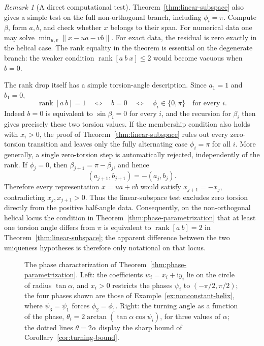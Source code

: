 \documentclass[10pt,a4paper]{amsart}
\theoremstyle{definition}
\theoremstyle{remark}
\newtheorem{remark}[theorem]{Remark}
\numberwithin{equation}{section}
\begin{document}
\begin{remark}[A direct computational test]\label{rem:linear-test}
Theorem~\ref{thm:linear-subspace} also gives a simple test on the full non-orthogonal branch, including $\phi_i=\pi$. Compute $\beta$, form $a,b$, and check whether $x$ belongs to their span. For numerical data one may solve $\min_{u,v}\|x-ua-vb\|$. For exact data, the residual is zero exactly in the helical case. The rank equality in the theorem is essential on the degenerate branch: the weaker condition $\operatorname{rank}[a\ b\ x]\le2$ would become vacuous when $b=0$.

The rank drop itself has a simple torsion-angle description. Since $a_1=1$ and $b_1=0$,
\[
\operatorname{rank}[a\ b]=1
\quad\Longleftrightarrow\quad
b=0
\quad\Longleftrightarrow\quad
\phi_i\in\{0,\pi\}\quad\text{for every }i.
\]
Indeed $b=0$ is equivalent to $\sin\beta_i=0$ for every $i$, and the recursion for $\beta_i$ then gives precisely these two torsion values. If the membership condition also holds with $x_i>0$, the proof of Theorem~\ref{thm:linear-subspace} rules out every zero-torsion transition and leaves only the fully alternating case $\phi_i=\pi$ for all $i$. More generally, a single zero-torsion step is automatically rejected, independently of the rank. If $\phi_j=0$, then $\beta_{j+1}=\pi-\beta_j$, and hence
\[
(a_{j+1},b_{j+1})=-(a_j,b_j).
\]
Therefore every representation $x=ua+vb$ would satisfy $x_{j+1}=-x_j$, contradicting $x_j,x_{j+1}>0$. Thus the linear-subspace test excludes zero torsion directly from the positive half-angle data. Consequently, on the non-orthogonal helical locus the condition in Theorem~\ref{thm:phase-parametrization} that at least one torsion angle differs from $\pi$ is equivalent to $\operatorname{rank}[a\ b]=2$ in Theorem~\ref{thm:linear-subspace}; the apparent difference between the two uniqueness hypotheses is therefore only notational on that locus.
\end{remark}

\begin{figure}[!ht]
\centering
\resizebox{0.97\textwidth}{!}{}
\caption{The phase characterization of Theorem~\ref{thm:phase-parametrization}. Left: the coefficients $w_i=x_i+\mathrm{i}y_i$ lie on the circle of radius $\tan\alpha$, and $x_i>0$ restricts the phases $\psi_i$ to $(-\pi/2,\pi/2)$; the four phases shown are those of Example~\ref{ex:nonconstant-helix}, where $\psi_3=\psi_1$ forces $\phi_2=\phi_1$. Right: the turning angle as a function of the phase, $\theta_i=2\arctan(\tan\alpha\cos\psi_i)$, for three values of $\alpha$; the dotted lines $\theta=2\alpha$ display the sharp bound of Corollary~\ref{cor:turning-bound}.}
\label{fig:phase-parametrisation}
\end{figure}
\end{document}
